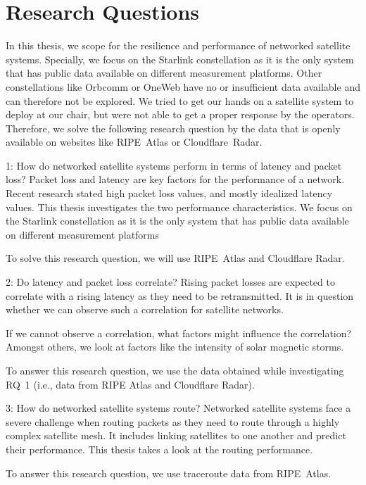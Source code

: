 \section{Research Questions} \label{sec:research-questions}

In this thesis, we scope for the resilience and performance of networked
satellite systems. Specially, we focus on the Starlink constellation as it is
the only system that has public data available on different measurement
platforms. Other constellations like Orbcomm or OneWeb have no or insufficient
data available and can therefore not be explored. We tried to get our
hands on a satellite system to deploy at our chair, but were not able to get a
proper response by the operators. Therefore, we solve the following research
question by the data that is openly available on websites like RIPE~Atlas or
Cloudflare~Radar.

\begin{rqbox}{1: How do networked satellite systems perform in terms of
		latency and packet loss?}
	Packet loss and latency are key factors for the performance of a
	network. Recent research stated high packet loss values, and mostly
	idealized latency values. This thesis investigates the two
	performance characteristics. We focus on the Starlink constellation as
	it is the only system that has public data available on different
	measurement platforms

	To solve this research question, we will use RIPE~Atlas and Cloudflare
	Radar.
\end{rqbox}

\begin{rqbox}{2: Do latency and packet loss correlate?}
	Rising packet losses are expected to correlate with a rising latency as
	they need to be retransmitted. It is in question whether we can observe
	such a correlation for satellite networks.

	If we cannot observe a correlation, what factors might influence the
	correlation? Amongst others, we look at factors like the intensity of
	solar magnetic storms.

	To answer this research question, we use the data obtained while
	investigating RQ~1 (i.e., data from RIPE Atlas and Cloudflare Radar).
\end{rqbox}

\begin{rqbox}{3: How do networked satellite systems route?}
	Networked satellite systems face a severe challenge when routing
	packets as they need to route through a highly complex satellite mesh.
	It includes linking satellites to one another and predict their
	performance. This thesis takes a look at the routing performance.

	To answer this research question, we use traceroute data from
	RIPE~Atlas.
\end{rqbox}

